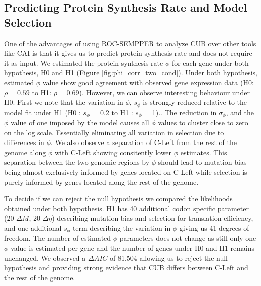 \documentclass[12pt]{article}
\begin{document}
\subsection*{Predicting Protein Synthesis Rate and Model Selection}
One of the advantages of using ROC-SEMPPER to analyze CUB over other tools like CAI \citep{sharp1987} is that it gives us to predict protein synthesis rate and does not require it as input.
We estimated the protein synthesis rate $\phi$ for each gene under both hypothesis, H0 and H1 (Figure \ref{fig:phi_corr_two_cond}). 
Under both hypothesis, estimated $\phi$ value show good agreement with observed gene expression data (H0: $\rho = 0.59$ to H1: $\rho = 0.69$).
However, we can observe interesting behaviour under H0.
First we note that the variation in $\phi$, $s_\phi$ is strongly reduced relative to the model fit under H1 (H0 : $s_{\phi}$ = 0.2 to H1 : $s_{\phi}$ = 1).. 
The reduction in $\sigma_\phi$, and the $\bar{\phi}$ value of one imposed by the model causes all $\phi$ values to cluster close to zero on the log scale. 
Essentially eliminating all variation in selection due to differences in $\phi$.
We also observe a separation of C-Left from the rest of the \kluyveri genome along $\phi$ with C-Left showing consitently lower $\phi$ estimates.
This separation between the two genomic regions by $\phi$ should lead to mutation bias being almost exclusively informed by genes located on C-Left while selection is purely informed by genes located along the rest of the genome.

To decide if we can reject the null hypothesis we compared the likelihoods obtained under both hypothesis.
H1 has 40 additional codon specific parameter (20 $\Delta M$, 20 $\Delta \eta$) describing mutation bias and selection for translation efficiency, and one additional $s_\phi$ term describing the variation in $\phi$ giving us 41 degrees of freedom.
The number of estimated $\phi$ parameters does not change as still only one $\phi$ value is estimated per gene and the number of genes under H0 and H1 remains unchanged.
We observed a $\Delta AIC$ of 81,504 allowing us to reject the null hypothesis and providing strong evidence that CUB differs between C-Left and the rest of the \kluyveri genome.
\end{document}
